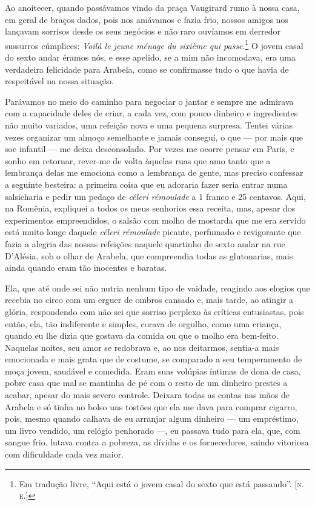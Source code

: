 Ao anoitecer, quando passávamos vindo da praça Vaugirard rumo à nossa
casa, em geral de braços dados, pois nos amávamos e fazia frio, nossos
amigos nos lançavam sorrisos desde os seus negócios e não raro ouvíamos
em derredor sussurros cúmplices: \emph{Voilà le jeune ménage du
sixième qui passe}.\footnote{Em tradução livre, ``Aqui está o jovem casal do sexto que está passando''. \textsc{{[}n.\,e.{]}}} O jovem casal do sexto andar éramos nós, e esse
apelido, se a mim não incomodava, era uma verdadeira felicidade para
Arabela, como se confirmasse tudo o que havia de respeitável na nossa
situação.

Parávamos no meio do caminho para negociar o jantar e sempre me admirava
com a capacidade deles de criar, a cada vez, com pouco dinheiro e
ingredientes não muito variados, uma refeição nova e uma pequena
surpresa. Tentei várias vezes organizar um almoço semelhante e jamais
consegui, o que --- por mais que soe infantil --- me deixa desconsolado.
Por vezes me ocorre pensar em Paris, e sonho em retornar, rever-me de
volta àquelas ruas que amo tanto que a lembrança delas me emociona como
a lembrança de gente, mas preciso confessar a seguinte besteira: a
primeira coisa que eu adoraria fazer seria entrar numa salsicharia e
pedir um pedaço de \emph{céleri rémoulade} a 1 franco e 25 centavos.
Aqui, na Romênia, expliquei a todos os meus senhorios essa receita, mas,
apesar dos experimentos empreendidos, o salsão com molho de mostarda que
me era servido está muito longe daquele \emph{céleri rémoulade}
picante, perfumado e revigorante que fazia a alegria das nossas
refeições naquele quartinho de sexto andar na rue D'Alésia, sob o olhar
de Arabela, que compreendia todas as glutonarias, mais ainda quando eram
tão inocentes e baratas.

Ela, que até onde sei não nutria nenhum tipo de vaidade, reagindo aos
elogios que recebia no circo com um erguer de ombros cansado e, mais
tarde, ao atingir a glória, respondendo com não sei que sorriso perplexo
às críticas entusiastas, pois então, ela, tão indiferente e simples,
corava de orgulho, como uma criança, quando eu lhe dizia que gostava da
comida ou que o molho era bem-feito. Naquelas noites, seu amor se
redobrava e, ao nos deitarmos, sentia-a mais emocionada e mais grata que
de costume, se comparado a seu temperamento de moça jovem, saudável e
comedida. Eram suas volúpias íntimas de dona de casa, pobre casa que mal
se mantinha de pé com o resto de um dinheiro prestes a acabar, apesar do
mais severo controle. Deixara todas as contas nas mãos de Arabela e só
tinha no bolso uns tostões que ela me dava para comprar cigarro, pois,
mesmo quando calhava de eu arranjar algum dinheiro --- um empréstimo, um
livro vendido, um relógio penhorado ---, eu passava tudo para ela, que,
com sangue frio, lutava contra a pobreza, as dívidas e os fornecedores,
saindo vitoriosa com dificuldade cada vez maior.

